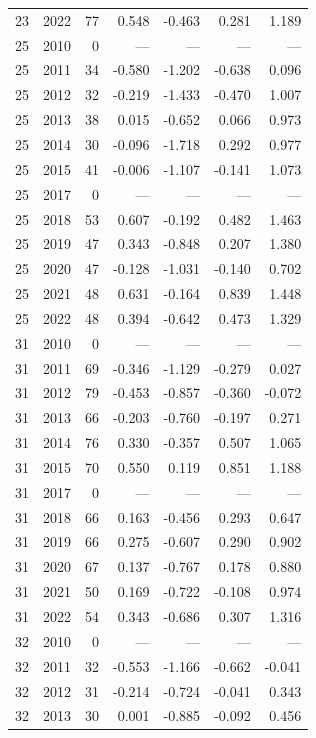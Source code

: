 \begin{longtable}{llrrrrr}
23 & 2022 & 77 & 0.548 & -0.463 & 0.281 & 1.189 \\
25 & 2010 & 0 & --- & --- & --- & --- \\
25 & 2011 & 34 & -0.580 & -1.202 & -0.638 & 0.096 \\
25 & 2012 & 32 & -0.219 & -1.433 & -0.470 & 1.007 \\
25 & 2013 & 38 & 0.015 & -0.652 & 0.066 & 0.973 \\
25 & 2014 & 30 & -0.096 & -1.718 & 0.292 & 0.977 \\
25 & 2015 & 41 & -0.006 & -1.107 & -0.141 & 1.073 \\
25 & 2017 & 0 & --- & --- & --- & --- \\
25 & 2018 & 53 & 0.607 & -0.192 & 0.482 & 1.463 \\
25 & 2019 & 47 & 0.343 & -0.848 & 0.207 & 1.380 \\
25 & 2020 & 47 & -0.128 & -1.031 & -0.140 & 0.702 \\
25 & 2021 & 48 & 0.631 & -0.164 & 0.839 & 1.448 \\
25 & 2022 & 48 & 0.394 & -0.642 & 0.473 & 1.329 \\
31 & 2010 & 0 & --- & --- & --- & --- \\
31 & 2011 & 69 & -0.346 & -1.129 & -0.279 & 0.027 \\
31 & 2012 & 79 & -0.453 & -0.857 & -0.360 & -0.072 \\
31 & 2013 & 66 & -0.203 & -0.760 & -0.197 & 0.271 \\
31 & 2014 & 76 & 0.330 & -0.357 & 0.507 & 1.065 \\
31 & 2015 & 70 & 0.550 & 0.119 & 0.851 & 1.188 \\
31 & 2017 & 0 & --- & --- & --- & --- \\
31 & 2018 & 66 & 0.163 & -0.456 & 0.293 & 0.647 \\
31 & 2019 & 66 & 0.275 & -0.607 & 0.290 & 0.902 \\
31 & 2020 & 67 & 0.137 & -0.767 & 0.178 & 0.880 \\
31 & 2021 & 50 & 0.169 & -0.722 & -0.108 & 0.974 \\
31 & 2022 & 54 & 0.343 & -0.686 & 0.307 & 1.316 \\
32 & 2010 & 0 & --- & --- & --- & --- \\
32 & 2011 & 32 & -0.553 & -1.166 & -0.662 & -0.041 \\
32 & 2012 & 31 & -0.214 & -0.724 & -0.041 & 0.343 \\
32 & 2013 & 30 & 0.001 & -0.885 & -0.092 & 0.456 \\

\end{longtable}
